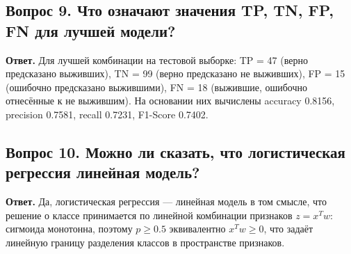 \documentclass[12pt,a4paper]{article}
\begin{document}
\subsection*{Вопрос 9. Что означают значения TP, TN, FP, FN для лучшей модели?}
\textbf{Ответ.} Для лучшей комбинации на тестовой выборке: TP = 47 (верно предсказано выживших), TN = 99 (верно предсказано не выживших), FP = 15 (ошибочно предсказано выжившими), FN = 18 (выжившие, ошибочно отнесённые к не выжившим). На основании них вычислены accuracy 0.8156, precision 0.7581, recall 0.7231, F1-Score 0.7402.

\subsection*{Вопрос 10. Можно ли сказать, что логистическая регрессия линейная модель?}
\textbf{Ответ.} Да, логистическая регрессия --- линейная модель в том смысле, что решение о классе принимается по линейной комбинации признаков \(z = x^T w\): сигмоида монотонна, поэтому \(p \ge 0.5\) эквивалентно \(x^T w \ge 0\), что задаёт линейную границу разделения классов в пространстве признаков.
\end{document}

